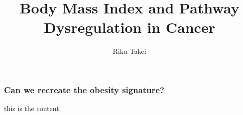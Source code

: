 \documentclass{beamer}
\title{Body Mass Index and Pathway Dysregulation in Cancer}
\author{Riku Takei}
\begin{document}
\frame{\titlepage}

\begin{frame}
	\begin{center}
		\frametitle{Can we recreate the obesity signature?}
	\end{center}
this is the content.
\end{frame}
\end{document}
